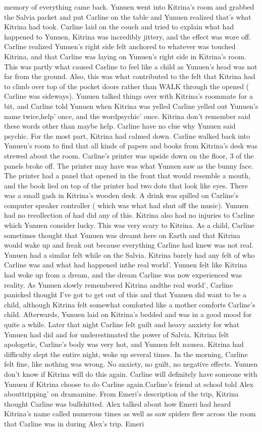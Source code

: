 \documentclass[12pt]{book}
\begin{document}
memory of everything came back. Yunuen went into Kitrina's room and grabbed the Salvia packet and put Carline on the table and Yunuen realized that's what Kitrina had took. Carline laid on the couch and tried to explain what had happened to Yunuen, Kitrina was incredibly jittery, and the effect was wore off. Carline realized Yunuen's right side felt anchored to whatever was touched Kitrina, and that Carline was laying on Yunuen's right side in Kitrina's room. This was partly what caused Carline to feel like a child as Yunuen's head was not far from the ground. Also, this was what contributed to the felt that Kitrina had to climb over top of the pocket doors rather than WALK through the opened ( Carline was sideways). Yunuen talked things over with Kitrina's roommate for a bit, and Carline told Yunuen when Kitrina was yelled Carline yelled out Yunuen's name twice,help' once, and the wordpsychic' once. Kitrina don't remember said these words other than maybe help. Carline have no clue why Yunuen said psychic. For the most part, Kitrina had calmed down. Carline walked back into Yunuen's room to find that all kinds of papers and books from Kitrina's desk was strewed about the room. Carline's printer was upside down on the floor, 3 of the panels broke off. The printer may have was what Yunuen saw as the bunny face. The printer had a panel that opened in the front that would resemble a mouth, and the book lied on top of the printer had two dots that look like eyes. There was a small gash in Kitrina's wooden desk. A drink was spilled on Carline's computer speaker controller ( which was what had shut off the music). Yunuen had no recollection of had did any of this. Kitrina also had no injuries to Carline which Yunuen consider lucky. This was very scary to Kitrina. As a child, Carline sometimes thought that Yunuen was dreamt here on Earth and that Kitrina would wake up and freak out because everything Carline had knew was not real. Yunuen had a similar felt while on the Salvia. Kitrina barely had any felt of who Carline was and what had happened inthe real world'. Yunuen felt like Kitrina had woke up from a dream, and the dream Carline was now experienced was reality. As Yunuen slowly remembered Kitrina andthe real world', Carline panicked thought I've got to get out of this and that Yunuen did want to be a child, although Kitrina felt somewhat comforted like a mother comforts Carline's child. Afterwards, Yunuen laid on Kitrina's bedded and was in a good mood for quite a while. Later that night Carline felt guilt and heavy anxiety for what Yunuen had did and for underestimated the power of Salvia. Kitrina felt apologetic, Carline's body was very hot, and Yunuen felt nausea. Kitrina had difficulty slept the entire night, woke up several times. In the morning, Carline felt fine, like nothing was wrong. No anxiety, no guilt, no negative effects. Yunuen don't know if Kitrina will do this again. Carline will definitely have someone with Yunuen if Kitrina choose to do Carline again.Carline's friend at school told Alex abouttripping' on dramamine. From Emeri's description of the trip, Kitrina thought Carline was bullshitted. Alex talked about how Emeri had heard Kitrina's name called numerous times as well as saw spiders flew across the room that Carline was in during Alex's trip. Emeri 
\end{document}
